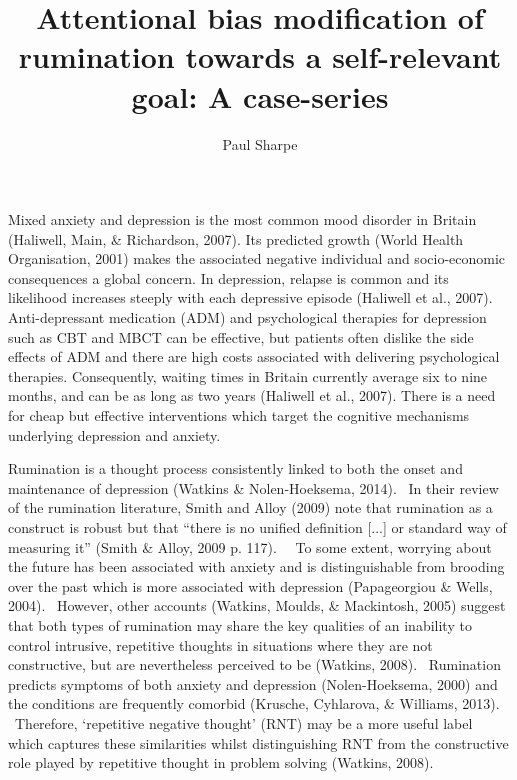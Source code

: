 \documentclass[man,a4paper,biblatex]{apa6}
\title{Attentional bias modification of rumination towards a self-relevant goal: A case-series}
\author{Paul Sharpe}
\affiliation{University of Exeter}
\begin{document}
\maketitle
{}
\tableofcontents
\clearpage\setcounter{page}{1}


Mixed anxiety and depression is the most common mood disorder in Britain
(Haliwell, Main, \& Richardson, 2007).  Its predicted growth (World
Health Organisation, 2001) makes the associated negative individual and
socio-economic consequences a global concern.  In depression, relapse
is common and its likelihood increases steeply with each depressive
episode (Haliwell et al., 2007).  Anti-depressant medication (ADM)
and psychological therapies for depression such as CBT and MBCT can be
effective, but patients often dislike the side effects of ADM and there
are high costs associated with delivering psychological therapies.
Consequently, waiting times in Britain currently average six to
nine months, and can be as long as two years (Haliwell et al., 2007).
There is a need for cheap but effective interventions which target the
cognitive mechanisms underlying depression and anxiety.

Rumination is a thought process consistently linked to both the onset and maintenance of depression (Watkins \& Nolen-Hoeksema, 2014). \ In their review of the rumination literature, Smith and Alloy (2009) note that rumination as a construct is robust but that ``there is no unified definition [...] or standard way of measuring it'' (Smith \& Alloy, 2009 p. 117). \ \ To some extent, worrying about the future has been associated with anxiety and is distinguishable from brooding over the past which is more associated with depression (Papageorgiou \& Wells, 2004). \ However, other accounts (Watkins, Moulds, \& Mackintosh, 2005) suggest that both types of rumination may share the key qualities of an inability to control intrusive, repetitive thoughts in situations where they are not constructive, but are nevertheless perceived to be (Watkins, 2008). \ Rumination predicts symptoms of both anxiety and depression (Nolen-Hoeksema, 2000) and the conditions are frequently comorbid (Krusche, Cyhlarova, \& Williams, 2013). \ Therefore, `repetitive negative thought' (RNT) may be a more useful label which captures these similarities whilst distinguishing RNT from the constructive role played by repetitive thought in problem solving (Watkins, 2008).
\end{document}
